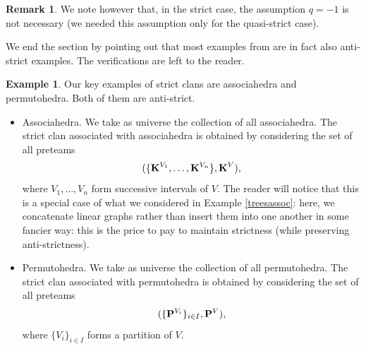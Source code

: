 \documentclass{article}
\theoremstyle{plain}
\theoremstyle{definition}
\newtheorem{remark}[thm]{Remark}
\newtheorem{example}[thm]{\sc Example}
\newcommand{\hyper}[1]{{\bf #1}}
\begin{document}
\begin{remark} \label{not-subsume}
We note however that, in the strict case, the assumption $q=-1$ is not necessary (we needed
this assumption only for the quasi-strict case).
\end{remark}

We end the section by pointing out that most examples from \cite{PLBJ1} are in fact also anti-strict examples.
The verifications are left to the reader.

\begin{example} \label{strict-antistrict-examples} Our key examples of strict clans are
associahedra and permutohedra. Both of them are anti-strict.
\begin{itemize}
\item Associahedra. We take as universe the collection of all associahedra. The strict clan associated with associahedra is obtained by considering the set of all  preteams $$(\{\hyper{K}^{V_1},\ldots,\hyper{K}^{V_n}\}, \hyper{K}^V),$$ where $V_1,\ldots,V_n$ form successive intervals of $V$. The reader will notice that this is a special case of what we considered in Example \ref{treesassoc}: here, we concatenate linear graphs rather than insert them into one another   in some fancier way: this is the price to pay to maintain strictness (while preserving anti-strictness).
\item Permutohedra.  We take as universe the collection of all permutohedra. The strict clan associated with permutohedra is obtained by considering the set of all  preteams $$(\{\hyper{P}^{V_i}\}_{i \in I}, \hyper{P}^V),$$ where $\{V_i\}_{i \in I}$ forms a partition of $V$.
\end{itemize}
\end{example}
\end{document}
